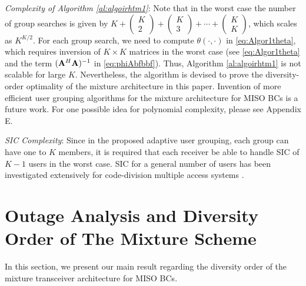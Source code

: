 \documentclass[11pt, draft, onecolumn ]{IEEEtran}
\begin{document}
{}{{\em Complexity of Algorithm \ref{al:algoirhtm1}}:  Note that in the worst case the number of group searches is given by $K+\left(\begin{array}{c}K\\2\end{array} \right)+ \left(\begin{array}{c}K\\3\end{array} \right) + \cdots + \left(\begin{array}{c}K\\K\end{array} \right)$, which scales as $K^{K/2}$. For each group search, we need to compute $\theta(\cdot,\cdot)$ in  \eqref{eq:Algor1theta}, which requires inversion of $K\times K$ matrices in the worst case (see  \eqref{eq:Algor1theta} and the term $({\bf A}^H{\bf A})^{-1}$ in \eqref{eq:phiAbfbbf}).  Thus, Algorithm \ref{al:algoirhtm1} is not scalable for large $K$. Nevertheless, the algorithm is devised to prove the diversity-order optimality of the mixture architecture in this paper. Invention of more efficient user grouping algorithms for the mixture architecture for MISO BCs is a future work.
For one possible idea {for polynomial complexity}, please see Appendix E.
}



{{\em SIC Complexity}: Since in the proposed adaptive user grouping, each group can have one to $K$ members, it is required that each receiver be able to handle  SIC of $K-1$ users in the worst case. SIC for a general number of users has been investigated extensively for code-division multiple access systems \cite{JileiHou}.}




\section{Outage Analysis and Diversity Order of The Mixture Scheme}
\label{sec:outageAnalysis}



In this section, we present our main result  regarding the diversity order of the mixture transceiver architecture for MISO BCs.
\end{document}
